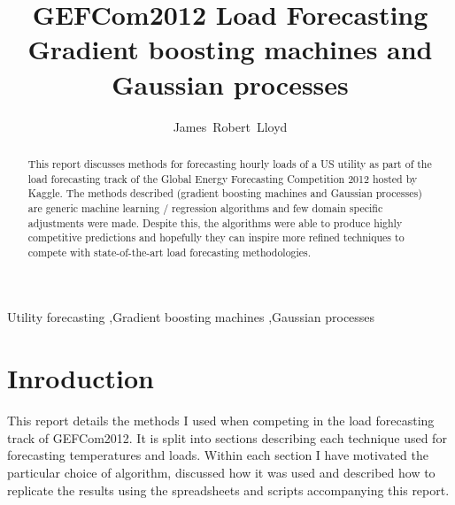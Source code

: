 \documentclass[preprint,authoryear,12pt]{elsarticle}
\begin{document}
\begin{frontmatter}


\title{GEFCom2012 Load Forecasting \\ Gradient boosting machines and Gaussian processes}
\author{James~Robert~Lloyd}
\address{Department of Engineering, University of Cambridge}


\author{}

\address{}

\begin{abstract}
This report discusses methods for forecasting hourly loads of a US utility as part of the load forecasting track of the Global Energy Forecasting Competition 2012 hosted by Kaggle.
The methods described (gradient boosting machines and Gaussian processes) are generic machine learning / regression algorithms and few domain specific adjustments were made.
Despite this, the algorithms were able to produce highly competitive predictions and hopefully they can inspire more refined techniques to compete with state-of-the-art load forecasting methodologies.
\end{abstract}

\begin{keyword}
Utility forecasting \sep Gradient boosting machines \sep Gaussian processes
\end{keyword}

\end{frontmatter}

\section{Inroduction}

This report details the methods I used when competing in the load forecasting track of GEFCom2012\footnotemark.
It is split into sections describing each technique used for forecasting temperatures and loads.
Within each section I have motivated the particular choice of algorithm, discussed how it was used and described how to replicate the results using the spreadsheets and scripts accompanying this report\footnotemark.
\end{document}
